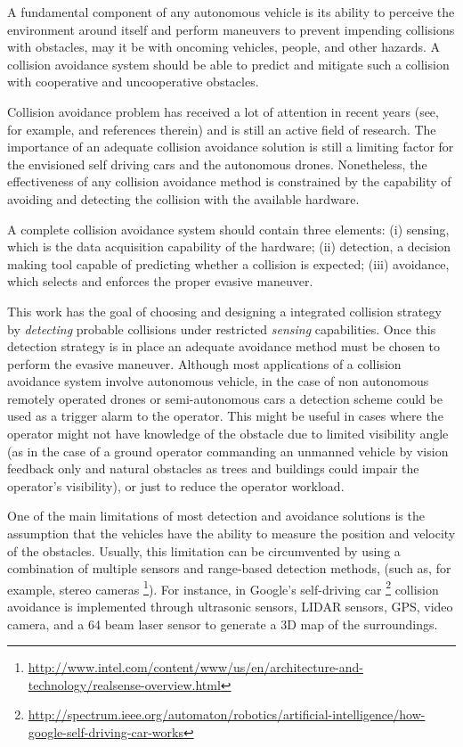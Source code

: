 \documentclass[]{aiaa-tc}%
\begin{document}
A fundamental component of any autonomous vehicle is its ability to perceive the environment around itself and perform maneuvers to prevent impending collisions with obstacles, may it be with  oncoming vehicles, people, and other hazards. A collision avoidance system should be able to predict and mitigate such a collision with cooperative and uncooperative obstacles.

Collision avoidance problem has received a lot of attention in recent years (see, for example, \cite{khatib96,chakravarthy98,carbone08,smith08,sti10,shankaran2011collision,rodriguez2011collision,mikaCA, gusrialdi2008coverage,laventall2008coverage} and references therein) and is still an active field of research. The importance of an adequate collision avoidance solution is still a limiting factor for the envisioned self driving cars and the autonomous drones.  Nonetheless, the effectiveness of any collision avoidance method is constrained by the capability of avoiding and detecting the collision with the available hardware.

A complete collision avoidance system should contain three elements: (i) sensing, which is the data acquisition capability of the hardware; (ii) detection, a decision making tool capable of predicting whether a collision is expected; (iii) avoidance, which selects and enforces the proper evasive maneuver.

This work has the goal of choosing and designing a integrated collision strategy by {\em detecting} probable collisions under restricted {\em sensing} capabilities. Once this detection strategy is in place an adequate avoidance method must be chosen to perform the evasive maneuver. Although most applications of a collision avoidance system involve autonomous vehicle, in the case of non autonomous remotely operated drones or semi-autonomous cars a detection scheme could be used as a trigger alarm to the operator. This might be useful in cases where the operator might not have knowledge of the obstacle due to limited visibility angle (as in the case of a ground operator commanding an unmanned vehicle by vision feedback only and natural obstacles as trees and buildings could impair the operator’s visibility), or just to reduce the operator workload.

One of the main limitations of most detection and avoidance solutions is the assumption that the vehicles have the ability to measure the position and velocity of the obstacles. Usually, this limitation can be circumvented by using a combination of multiple sensors and range-based detection methods, (such as, for example, stereo cameras \cite{BarryT14} \footnote{\url{http://www.intel.com/content/www/us/en/architecture-and-technology/realsense-overview.html}}). For instance, in Google's self-driving car \cite{rathod2013autonomous} \footnote{\url{http://spectrum.ieee.org/automaton/robotics/artificial-intelligence/how-google-self-driving-car-works}} collision avoidance is implemented through ultrasonic sensors, LIDAR sensors, GPS, video camera, and a 64 beam laser sensor to generate a 3D map of the surroundings.
\end{document}
